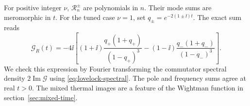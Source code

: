 For positive integer \(\nu\), \(\mathcal R_n^\pm\) are
polynomials in \(n\). Their mode sums are meromorphic in \(t\).
For the tuned case \(\nu=1\), set \(q_\pm=e^{-2(1\pm\ii)t}\).
The exact sum reads
\begin{equation}
 \mathcal G_R(t)=-4\ii\left[
 (1+\ii)\frac{q_+(1+q_+)}{(1-q_+)^3}
 -(1-\ii)\frac{q_-(1+q_-)}{(1-q_-)^3}
 \right].
 \label{eq:lovelock-retarded-tuned}
\end{equation}
We check this expression by Fourier transforming the
commutator spectral density \(2\operatorname{Im}\mathcal G\)
using \eqref{eq:lovelock-spectral}. The pole and frequency
sums agree at real \(t>0\). The mixed thermal images are
a feature of the Wightman function in
section~\ref{sec:mixed-time}.
